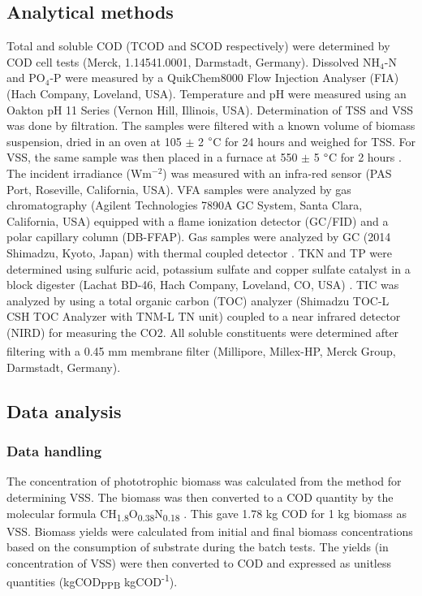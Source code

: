\subsection{Analytical methods}
Total and soluble COD (TCOD and SCOD respectively) were determined by COD cell tests (Merck, 1.14541.0001, Darmstadt, Germany). Dissolved $\mathrm{NH_4\mbox{-}N}$ and $\mathrm{PO_4\mbox{-}P}$ were measured by a QuikChem8000 Flow Injection Analyser (FIA) (Hach Company, Loveland, USA). Temperature and pH were measured using an Oakton pH 11 Series (Vernon Hill, Illinois, USA). Determination of TSS and VSS was done by filtration. The samples were filtered with a known volume of biomass suspension, dried in an oven at 105 $\pm$ 2 $\degree$C for 24 hours and weighed for TSS. For VSS, the same sample was then placed in a furnace at 550 $\pm$ 5 $\degree$C for 2 hours \cite{APHA1998}. The incident irradiance ($\mathrm{Wm^{-2}}$) was measured with an infra-red sensor (PAS Port\texttrademark, Roseville, California, USA). VFA samples were analyzed by gas chromatography (Agilent Technologies 7890A GC System, Santa Clara, California, USA) equipped with a flame ionization detector (GC/FID) and a polar capillary column (DB-FFAP). Gas samples were analyzed by GC (2014 Shimadzu, Kyoto, Japan) with thermal coupled detector \cite{Tait2009}. TKN and TP were determined using sulfuric acid, potassium sulfate and copper sulfate catalyst in a block digester (Lachat BD-46, Hach Company, Loveland, CO, USA) \cite{Patton1992}. TIC was analyzed by using a total organic carbon (TOC) analyzer (Shimadzu TOC-L CSH TOC Analyzer with TNM-L TN unit) coupled to a near infrared detector (NIRD) for measuring the CO2. All soluble constituents were determined after filtering with a 0.45 mm membrane filter (Millipore, Millex\textsuperscript{\textregistered}-HP, Merck Group, Darmstadt, Germany).

\subsection{Data analysis}
\subsubsection{Data handling}
The concentration of phototrophic biomass was calculated from the method for determining VSS. The biomass was then converted to a COD quantity by the molecular formula CH\textsubscript{1.8}O\textsubscript{0.38}N\textsubscript{0.18} \cite{Mckinlay2010}. This gave 1.78 kg COD for 1 kg biomass as VSS. Biomass yields were calculated from initial and final biomass concentrations based on the consumption of substrate during the batch tests. The yields (in concentration of VSS) were then converted to COD and expressed as unitless quantities (kgCOD\textsubscript{PPB} kgCOD\textsuperscript{-1}). 

